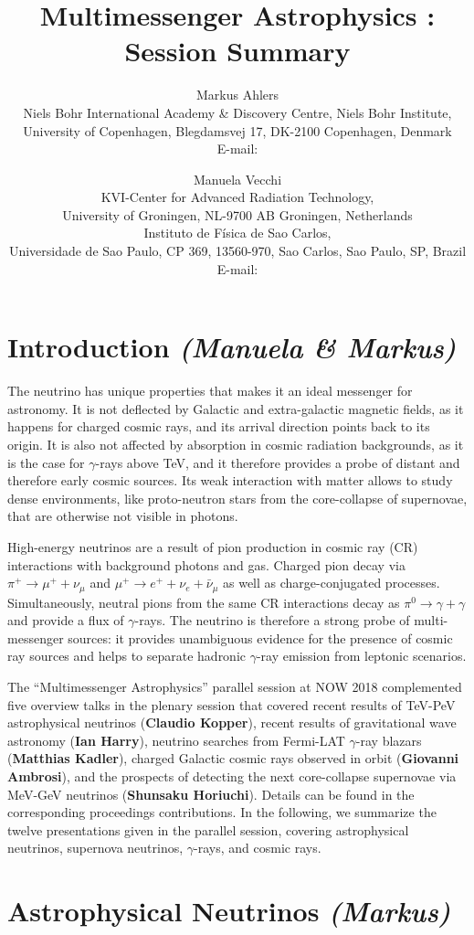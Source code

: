 \documentclass{PoS}
\title{Multimessenger Astrophysics : Session Summary}
\author{Markus Ahlers\\
        Niels Bohr International Academy \& Discovery Centre, Niels Bohr Institute,\\University of Copenhagen, Blegdamsvej 17, DK-2100 Copenhagen, Denmark\\
        E-mail: \email{markus.ahlers@nbi.ku.dk}}
\author{Manuela Vecchi\\
       KVI-Center for Advanced Radiation Technology,\\University of Groningen, NL-9700 AB Groningen, Netherlands\\Instituto de F\'isica de Sao Carlos,\\ Universidade de Sao Paulo, CP 369, 13560-970, Sao Carlos, Sao Paulo, SP, Brazil\\
        E-mail: \email{m.vecchi@rug.nl}}
\begin{document}
\section{Introduction {\it (Manuela \& Markus)}}


The neutrino has unique properties that makes it an ideal messenger for astronomy. It is not deflected by Galactic and extra-galactic magnetic fields, as it happens for charged cosmic rays, and its arrival direction points back to its origin. It is also not affected by absorption in cosmic radiation backgrounds, as it is the case for $\gamma$-rays above TeV, and it therefore provides a probe of distant and therefore early cosmic sources. Its weak interaction with matter allows to study dense environments, like proto-neutron stars from the core-collapse of supernovae, that are otherwise not visible in photons.

High-energy neutrinos are a result of pion production in cosmic ray (CR) interactions with background photons and gas. Charged pion decay via $\pi^+\to\mu^++\nu_\mu$ and $\mu^+\to e^++\nu_e+\bar\nu_\mu$ as well as charge-conjugated processes. Simultaneously, neutral pions from the same CR interactions decay as $\pi^0\to\gamma+\gamma$ and provide a flux of $\gamma$-rays. The neutrino is therefore a strong probe of multi-messenger sources: it provides unambiguous evidence for the presence of cosmic ray sources and helps to separate hadronic $\gamma$-ray emission from leptonic scenarios.

The ``Multimessenger Astrophysics'' parallel session at NOW 2018 complemented five overview talks in the plenary session that covered recent results of TeV-PeV astrophysical neutrinos ({\bf Claudio Kopper}), recent results of gravitational wave astronomy ({\bf Ian Harry}), neutrino searches from Fermi-LAT $\gamma$-ray blazars ({\bf Matthias Kadler}), charged Galactic cosmic rays observed in orbit ({\bf  Giovanni Ambrosi}), and the prospects of detecting the next core-collapse supernovae via MeV-GeV neutrinos ({\bf Shunsaku Horiuchi}). Details can be found in the corresponding proceedings contributions. In the following, we summarize the twelve presentations given in the parallel session, covering astrophysical neutrinos, supernova neutrinos, $\gamma$-rays, and cosmic rays.

\section{Astrophysical Neutrinos {\it (Markus)}}
\end{document}

